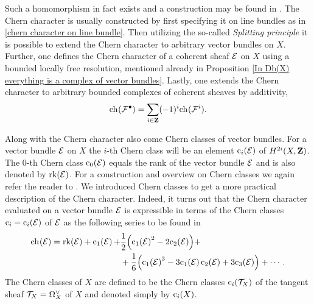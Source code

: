 \begin{remark}
    Such a homomorphism in fact exists and a construction may be found in \cite[\S 3.2]{Fulton1998}. The Chern character is usually constructed by first specifying it on line bundles as in \ref{chern character on line bundle}. Then utilizing the so-called \emph{Splitting principle} \cite[\S 3.2, Remark 3.2.3]{Fulton1998} it is possible to extend the Chern character to arbitrary vector bundles on $X$. Further, one defines the Chern character of a coherent sheaf $\mathcal E$ on $X$ using a bounded locally free resolution, mentioned already in Proposition \ref{In Db(X) everything is a complex of vector bundles}. Lastly, one extends the Chern character to arbitrary bounded complexes of coherent sheaves by additivity, \ie
    \[
        \ch[](\F^\bullet) = \sum_{i \in \Z}(-1)^i\ch[](\F^i).
    \] 
\end{remark}

Along with the Chern character also come Chern classes of vector bundles. For a vector bundle $\mathcal E$ on $X$ the $i$-th Chern class will be an element $\cclass[i](\E)$ of $H^{2i}(X, \mathbf Z)$. The $0$-th Chern class $\cclass[0](\E)$ equals the rank of the vector bundle $\mathcal E$ and is also denoted by $\operatorname{rk}(\mathcal E)$. For a construction and overview on Chern classes we again refer the reader to \cite[\S 3.2]{Fulton1998}.
We introduced Chern classes to get a more practical description of the Chern character. Indeed, it turns out that the Chern character evaluated on a vector bundle $\mathcal E$ is expressible in terms of the Chern classes $\cclass[i] = \cclass[i](\E)$ of $\mathcal E$ as the following series to be found in \cite[\S 3, Example 3.2.3]{Fulton1998}
\begin{align}
    \label{eq: chern character series expansion}
    \ch[]{\E} = \rk{\E} + \cclass[1]{\E} + &\frac{1}{2}\Bigl(\cclass[1]{\E}^2 - 2\cclass[2]{\E}\Bigr) + \notag
    \\ &+ \frac{1}{6}\Bigl(\cclass[1]{\E}^3 - 3 \cclass[1]{\E}\cclass[2]{\E} + 3\cclass[3]{\E}\Bigr) + \cdots.
\end{align}
The Chern classes of $X$ are defined to be the Chern classes $\cclass[i](\tangent{X})$ of the tangent sheaf $\mathcal{T}_{X} = \Omega_X^\vee$ of $X$ and denoted simply by $\cclass[i](X)$.



